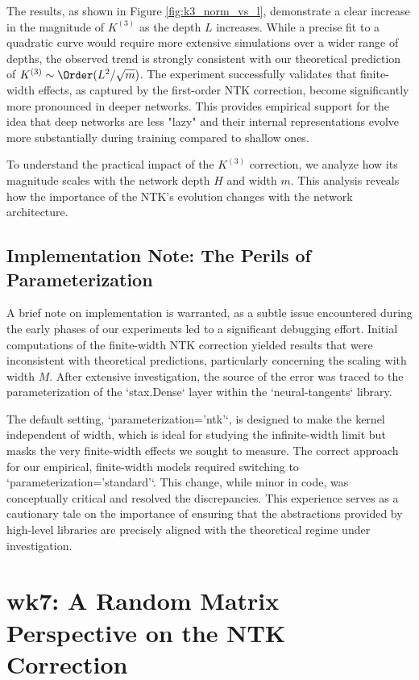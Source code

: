 \documentclass[a4paper]{article}
\begin{document}
The results, as shown in Figure \ref{fig:k3_norm_vs_l}, demonstrate a clear increase in the magnitude of $K^{(3)}$ as the depth $L$ increases. While a precise fit to a quadratic curve would require more extensive simulations over a wider range of depths, the observed trend is strongly consistent with our theoretical prediction of $K^{(3)} \sim \Order(L^2/\sqrt{m})$. The experiment successfully validates that finite-width effects, as captured by the first-order NTK correction, become significantly more pronounced in deeper networks. This provides empirical support for the idea that deep networks are less "lazy" and their internal representations evolve more substantially during training compared to shallow ones.


To understand the practical impact of the $K^{(3)}$ correction, we analyze how its magnitude scales with the network depth $H$ and width $m$. This analysis reveals how the importance of the NTK's evolution changes with the network architecture.

\subsection{Implementation Note: The Perils of Parameterization}

A brief note on implementation is warranted, as a subtle issue encountered during the early phases of our experiments led to a significant debugging effort. Initial computations of the finite-width NTK correction yielded results that were inconsistent with theoretical predictions, particularly concerning the scaling with width $M$. After extensive investigation, the source of the error was traced to the parameterization of the `stax.Dense` layer within the `neural-tangents` library.

The default setting, `parameterization='ntk'`, is designed to make the kernel independent of width, which is ideal for studying the infinite-width limit but masks the very finite-width effects we sought to measure. The correct approach for our empirical, finite-width models required switching to `parameterization='standard'`. This change, while minor in code, was conceptually critical and resolved the discrepancies. This experience serves as a cautionary tale on the importance of ensuring that the abstractions provided by high-level libraries are precisely aligned with the theoretical regime under investigation.


\section{wk7: A Random Matrix Perspective on the NTK Correction}
\end{document}
